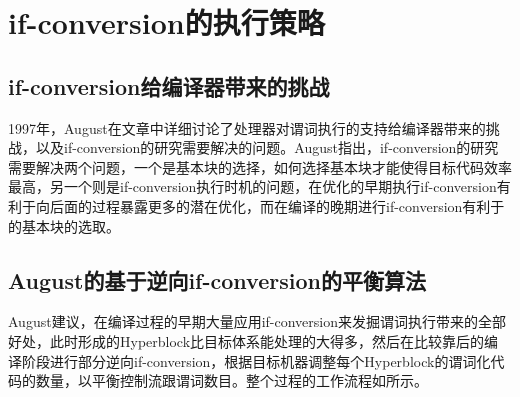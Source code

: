 \section{if-conversion的执行策略}

\subsection{if-conversion给编译器带来的挑战}

1997年，August在文章中详细讨论了处理器对谓词执行的支持给编译器带来的挑战，以及if-conversion的研究需要解决的问题\cite{August1997}。August指出，if-conversion的研究需要解决两个问题，一个是基本块的选择，如何选择基本块才能使得目标代码效率最高，另一个则是if-conversion执行时机的问题，在优化的早期执行if-conversion有利于向后面的过程暴露更多的潜在优化，而在编译的晚期进行if-conversion有利于的基本块的选取。

\subsection{August的基于逆向if-conversion的平衡算法}

August建议，在编译过程的早期大量应用if-conversion来发掘谓词执行带来的全部好处，此时形成的Hyperblock比目标体系能处理的大得多，然后在比较靠后的编译阶段进行部分逆向if-conversion，根据目标机器调整每个Hyperblock的谓词化代码的数量，以平衡控制流跟谓词数目。整个过程的工作流程如所示。

